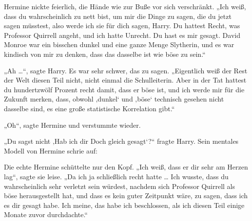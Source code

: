 Hermine nickte feierlich, die Hände wie zur Buße vor sich verschränkt.
„Ich weiß, dass du wahrscheinlich zu nett bist, um mir die Dinge zu sagen, die du jetzt sagen müsstest, also werde ich sie für dich sagen, Harry. Du hattest Recht, was Professor Quirrell angeht, und ich hatte Unrecht. Du hast es mir gesagt. David Monroe war ein bisschen dunkel und eine ganze Menge Slytherin, und es war kindisch von mir zu denken, dass das dasselbe ist wie böse zu sein.“

„Ah …“, sagte Harry. Es war sehr schwer, das zu sagen.
„Eigentlich weiß der Rest der Welt diesen Teil nicht, nicht einmal die Schulleiterin. Aber in der Tat hattest du hundertzwölf Prozent recht damit, dass er böse ist, und ich werde mir für die Zukunft merken, dass, obwohl ‚dunkel‘ und ‚böse‘ technisch gesehen nicht dasselbe sind, es eine große statistische Korrelation gibt.“

„Oh“, sagte Hermine und verstummte wieder.

„Du sagst nicht ‚Hab ich dir Doch gleich gesagt‘?“ fragte Harry.
Sein mentales Modell von Hermine schrie auf:

Die echte Hermine schüttelte nur den Kopf.
„Ich weiß, dass er dir sehr am Herzen lag“, sagte sie leise.
„Da ich ja schließlich recht hatte … Ich wusste, dass du wahrscheinlich sehr verletzt sein würdest, nachdem sich Professor Quirrell als böse herausgestellt hat, und dass es kein guter Zeitpunkt wäre, zu sagen, dass ich es dir gesagt habe. Ich meine, das habe ich beschlossen, als ich diesen Teil einige Monate zuvor durchdachte.“

